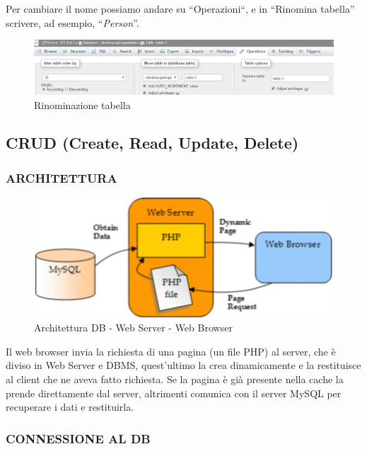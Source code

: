 Per cambiare il nome possiamo andare su “Operazioni“, e in “Rinomina tabella” scrivere, ad esempio, “\textit{Person}”. 

\begin{center}
\begin{figure}[H]
\centering
\includegraphics[scale=1]{figures/rename_table.png}
\caption{Rinominazione tabella} 
\end{figure}
\end{center} 


\subsection{CRUD (Create, Read, Update, Delete)}

\subsubsection{ARCHITETTURA}

\begin{center}
\begin{figure}[H]
\centering
\includegraphics[scale=1]{figures/architecture.png}
\caption{Architettura DB - Web Server - Web Browser} 
\end{figure}
\end{center} 

Il web browser invia la richiesta di una pagina (un file PHP) al server, che è diviso in Web Server e DBMS, quest’ultimo la crea dinamicamente e la restituisce al client che ne aveva fatto richiesta. Se la pagina è già presente nella cache la prende direttamente dal server, altrimenti comunica con il server MySQL per recuperare i dati e restituirla. 


\subsubsection{CONNESSIONE AL DB}

